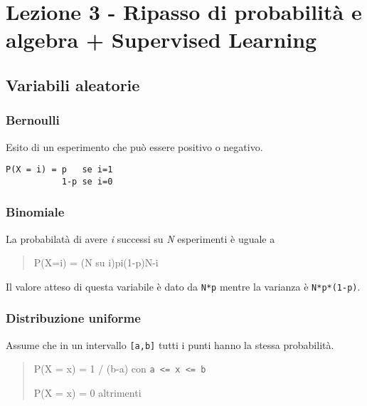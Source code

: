 \section{Lezione 3 - Ripasso di probabilità e algebra + Supervised Learning}\label{lezione-3---ripasso-di-probabilituxe0-e-algebra-supervised-learning}

\subsection{Variabili aleatorie}\label{variabili-aleatorie}

\subsubsection{Bernoulli}\label{bernoulli}

Esito di un esperimento che può essere positivo o negativo.

\begin{verbatim}
P(X = i) = p   se i=1 
           1-p se i=0
\end{verbatim}

\subsubsection{Binomiale}\label{binomiale}

La probabilatà di avere \emph{i} successi su \emph{N} esperimenti è
uguale a

\begin{quote}
P(X=i) = (N su i)pi(1-p)N-i
\end{quote}

Il valore atteso di questa variabile è dato da \texttt{N*p} mentre la
varianza è \texttt{N*p*(1-p)}.

\subsubsection{Distribuzione uniforme}\label{distribuzione-uniforme}

Assume che in un intervallo \texttt{{[}a,b{]}} tutti i punti hanno la
stessa probabilità.

\begin{quote}
P(X = x) = 1 / (b-a) con \texttt{a\ \textless{}=\ x\ \textless{}=\ b}

P(X = x) = 0 altrimenti
\end{quote}

